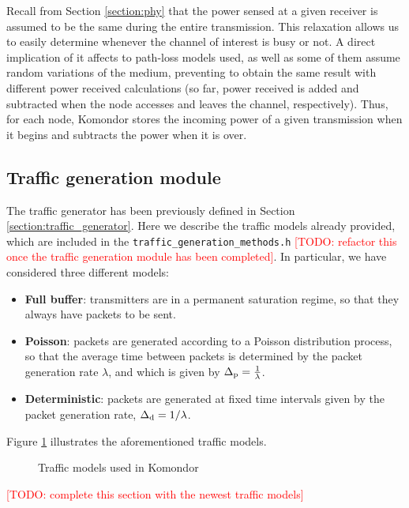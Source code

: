 \documentclass[a4paper]{article}
\begin{document}
Recall from Section \ref{section:phy} that the power sensed at a given receiver is assumed to be the same during the entire transmission. This relaxation allows us to easily determine whenever the channel of interest is busy or not. A direct implication of it affects to path-loss models used, as well as some of them assume random variations of the medium, preventing to obtain the same result with different power received calculations (so far, power received is added and subtracted when the node accesses and leaves the channel, respectively). Thus, for each node, Komondor stores the incoming power of a given transmission when it begins and subtracts the power when it is over. 

\subsection{Traffic generation module}
\label{section:traffic_modelling}
The traffic generator has been previously defined in Section \ref{section:traffic_generator}. Here we describe the traffic models already provided, which are included in the \texttt{traffic\_generation\_methods.h} \textcolor{red}{[TODO: refactor this once the traffic generation module has been completed]}. In particular, we have considered three different models:
\begin{itemize}
	\item \textbf{Full buffer}: transmitters are in a permanent saturation regime, so that they always have packets to be sent.
	\item \textbf{Poisson}: packets are generated according to a Poisson distribution process, so that the average time between packets is determined by the packet generation rate $\lambda$, and which is given by $\Delta_{\rm p} = \frac{1}{\lambda}$.
	\item \textbf{Deterministic}: packets are generated at fixed time intervals given by the packet generation rate, $\Delta_{\rm d} = 1/\lambda$.
\end{itemize}

Figure \ref{fig:traffic_models} illustrates the aforementioned traffic models. 
\begin{figure}[h!]
	\centering
	\caption{Traffic models used in Komondor}
	\label{fig:traffic_models}
\end{figure}	

\textcolor{red}{[TODO: complete this section with the newest traffic models]}
\end{document}
